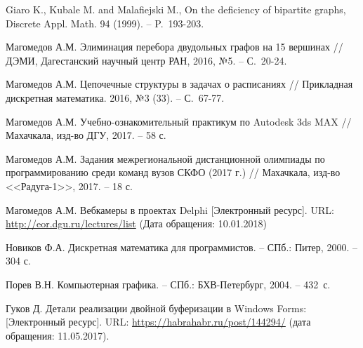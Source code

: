 \begin{thebibliography}{1}
Giaro K., Kubale M. and Malafiejski M., On the deficiency of bipartite graphs, Discrete Appl.
Math. 94 (1999). – P.~193-203.

Магомедов А.М. Элиминация перебора двудольных графов на 15 вершинах // ДЭМИ, Дагестанский научный центр РАН, 2016,
№5. – С.~20-24.

Магомедов А.М. Цепочечные структуры в задачах о расписаниях // Прикладная дискретная математика. 2016, №3 (33). – С.~67-77.





%





Магомедов А.М. Учебно-ознакомительный практикум по Autodesk 3ds MAX // Махачкала, изд-во ДГУ, 2017.
– 58 с.

Магомедов А.М. Задания межрегиональной дистанционной олимпиады по программированию среди команд
вузов СКФО (2017 г.) // Махачкала, изд-во <<Радуга-1>>, 2017. – 18 с.


Магомедов А.М. Вебкамеры в проектах Delphi [Электронный ресурс]. URL:
\url{http://eor.dgu.ru/lectures/list} (Дата обращения: 10.01.2018)



Новиков Ф.А. Дискретная математика для программистов. – СПб.: Питер, 2000. – 304 с.

Порев В.Н. Компьютерная графика. – СПб.: БХВ-Петербург, 2004. – 432~с.

Гуков Д. Детали реализации двойной буферизации в Windows Forms: [Электронный ресурс].
URL: \href{https://habrahabr.ru/post/144294/}{https://habrahabr.ru/post/144294/} (дата обращения: 11.05.2017).


\end{thebibliography}
